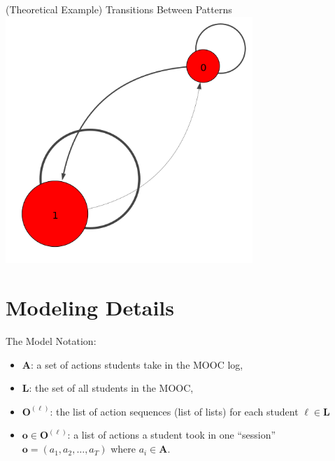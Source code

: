 \documentclass[10pt]{beamer}
\begin{document}
\begin{frame}{(Theoretical Example) Transitions Between Patterns}
  \centering
  \includegraphics[width=0.7\textwidth]{../figures/example/trans.png}
\end{frame}

\section{Modeling Details}

\begin{frame}{The Model}
  Notation:
  \begin{itemize}
    \item $\mathbf{A}$: a set of actions students take in the MOOC log,
    \item $\mathbf{L}$: the set of all students in the MOOC,
    \item $\mathbf{O}^{(\ell)}$: the list of action sequences (list of
        lists) for each student $\ell \in \mathbf{L}$
    \item $\mathbf{o} \in \mathbf{O}^{(\ell)}$: a list of actions a student
        took in one ``session'' $\mathbf{o} = (a_1, a_2, \ldots, a_T)$
        where $a_i \in \mathbf{A}$.
  \end{itemize}
\end{frame}
\end{document}
